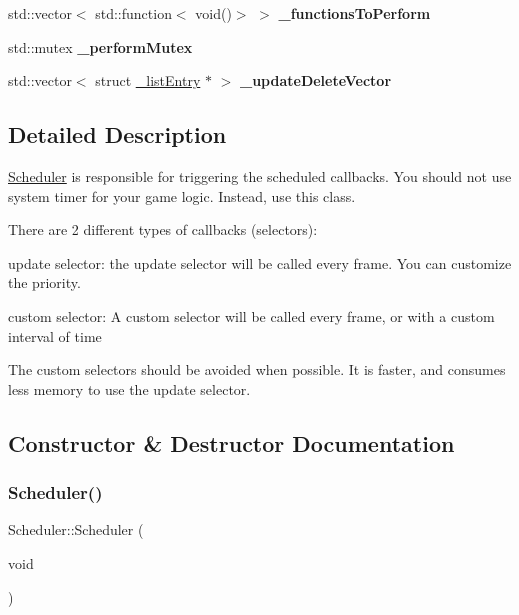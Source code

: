 \begin{DoxyCompactItemize}
\mbox{\label{classScheduler_a024850bf53629336393fccf31d333606}} 
std\+::vector$<$ std\+::function$<$ void()$>$ $>$ {\bfseries \+\_\+functions\+To\+Perform}
\item 
\mbox{\label{classScheduler_aed63ec9d9751e86abc953ea06ee58388}} 
std\+::mutex {\bfseries \+\_\+perform\+Mutex}
\item 
\mbox{\label{classScheduler_a91e5bcc3383dd13d978d37c0e597975a}} 
std\+::vector$<$ struct \hyperlink{struct__listEntry}{\+\_\+list\+Entry} $\ast$ $>$ {\bfseries \+\_\+update\+Delete\+Vector}
\end{DoxyCompactItemize}


\subsection{Detailed Description}
\hyperlink{classScheduler}{Scheduler} is responsible for triggering the scheduled callbacks. You should not use system timer for your game logic. Instead, use this class. 

There are 2 different types of callbacks (selectors)\+:


\begin{DoxyItemize}
\item update selector\+: the \textquotesingle{}update\textquotesingle{} selector will be called every frame. You can customize the priority.
\item custom selector\+: A custom selector will be called every frame, or with a custom interval of time
\end{DoxyItemize}

The \textquotesingle{}custom selectors\textquotesingle{} should be avoided when possible. It is faster, and consumes less memory to use the \textquotesingle{}update selector\textquotesingle{}. 

\subsection{Constructor \& Destructor Documentation}
\mbox{\label{classScheduler_a3b61aac11466cd45ae42ab8c2b0013f6}} 
\subsubsection{\texorpdfstring{Scheduler()}{Scheduler()}\hspace{0.1cm}{\footnotesize\ttfamily [1/2]}}
{\footnotesize\ttfamily Scheduler\+::\+Scheduler (\begin{DoxyParamCaption}\item[{void}]{ }\end{DoxyParamCaption})}

